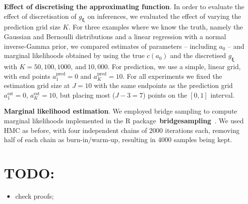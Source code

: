 \documentclass[a4paper, notitlepage, 11pt]{article}
\begin{document}
\textbf{Effect of discretising the approximating function}.
In order to evaluate the effect of discretisation of $g_{\boldsymbol\xi}$ on inferences, we evaluated the effect of varying the prediction grid size $K$.
For three examples where we know the truth, namely the Gaussian and Bernoulli distributions and a linear regression with a normal inverse-Gamma prior, we compared estimates of parameters -- including $a_0$ -- and marginal likelihoods obtained by using the true $c(a_0)$ and the discretised $g_{\boldsymbol\xi}$ with $K =  50, 100, 1000,~\text{and}\: 10, 000$.
For prediction, we use a simple, linear grid, with end points $a^{\text{pred}}_1 = 0$ and $a^{\text{pred}}_K = 10$.
For all experiments we fixed the estimation grid size at $J = 10$ with the same endpoints as the prediction grid $a^{\text{est}}_1 = 0$, $a^{\text{est}}_K = 10$, but placing most ($J-3 = 7$) points on the $[0, 1]$ interval.

\textbf{Marginal likelihood estimation}.
We employed  bridge sampling to compute marginal likelihoods implemented in the R package~\textbf{bridgesampling}~\citep{Gronau2017}.
We used HMC as before, with four independent chains of $2000$ iterations each, removing half of each chain as burn-in/warm-up, resulting in $4000$ samples being kept.


%  

\section*{TODO:}
\begin{itemize}
 \item check proofs;
\end{itemize}
\end{document}
